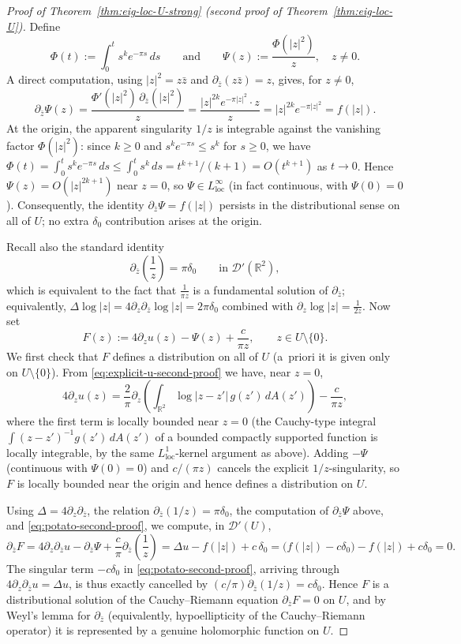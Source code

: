 \documentclass[a4paper,11pt,reqno]{amsart}
\numberwithin{equation}{section}
\theoremstyle{plain} %
\theoremstyle{definition} %
\theoremstyle{remark}
\newcommand{\R}{\mathbb{R}}
\begin{document}
\begin{proof}[Proof of Theorem~\ref{thm:eig-loc-U-strong} (second proof of Theorem~\ref{thm:eig-loc-U})]
Define
\[
\Phi(t):=\int_0^t s^k e^{-\pi s}\,ds
\qquad\text{and}\qquad
\Psi(z):=\frac{\Phi(|z|^2)}{z},
\quad z\neq 0.
\]
A direct computation, using \(|z|^2=z\bar z\) and \(\partial_{\bar z}(z\bar z)=z\), gives, for
\(z\neq 0\),
\[
\partial_{\bar z}\Psi(z)
=
\frac{\Phi'(|z|^2)\,\partial_{\bar z}(|z|^2)}{z}
=
\frac{|z|^{2k}e^{-\pi|z|^2}\cdot z}{z}
=
|z|^{2k}e^{-\pi|z|^2}
=
f(|z|).
\]
At the origin, the apparent singularity \(1/z\) is integrable against the vanishing factor
\(\Phi(|z|^2)\): since \(k\ge 0\) and \(s^k e^{-\pi s}\le s^k\) for \(s\ge 0\), we have
\(\Phi(t)=\int_0^t s^k e^{-\pi s}\,ds\le \int_0^t s^k\,ds = t^{k+1}/(k+1)=O(t^{k+1})\) as
\(t\to 0\). Hence \(\Psi(z)=O(|z|^{2k+1})\) near \(z=0\), so \(\Psi\in L^\infty_{\mathrm{loc}}\)
(in fact continuous, with \(\Psi(0)=0\)). Consequently, the identity
\(\partial_{\bar z}\Psi=f(|z|)\) persists in the distributional sense on all of \(U\); no extra
\(\delta_0\) contribution arises at the origin.

Recall also the standard identity
\[
\partial_{\bar z}\!\left(\frac{1}{z}\right)=\pi\delta_0
\qquad\text{in }\mathcal D'(\R^2),
\]
which is equivalent to the fact that \(\frac{1}{\pi z}\) is a fundamental solution of
\(\partial_{\bar z}\); equivalently, \(\Delta\log|z|=4\partial_z\partial_{\bar z}\log|z|=2\pi\delta_0\)
combined with \(\partial_z\log|z|=\frac{1}{2z}\). Now set
\[
F(z):=4\partial_z u(z)-\Psi(z)+\frac{c}{\pi z},
\qquad z\in U\setminus\{0\}.
\]
We first check that \(F\) defines a distribution on all of \(U\) (a~priori it is given only on
\(U\setminus\{0\}\)). From \eqref{eq:explicit-u-second-proof} we have, near \(z=0\),
\[
4\partial_z u(z)
=
\frac{2}{\pi}\partial_z\!\left(\int_{\R^2}\log|z-z'|\,g(z')\,dA(z')\right)-\frac{c}{\pi z},
\]
where the first term is locally bounded near \(z=0\) (the Cauchy-type integral
\(\int (z-z')^{-1} g(z')\,dA(z')\) of a bounded compactly supported function is locally
integrable, by the same \(L^1_{\mathrm{loc}}\)-kernel argument as above). Adding \(-\Psi\)
(continuous with \(\Psi(0)=0\)) and \(c/(\pi z)\) cancels the explicit \(1/z\)-singularity, so
\(F\) is locally bounded near the origin and hence defines a distribution on \(U\).

Using \(\Delta=4\partial_z\partial_{\bar z}\), the relation \(\partial_{\bar z}(1/z)=\pi\delta_0\),
the computation of \(\partial_{\bar z}\Psi\) above, and \eqref{eq:potato-second-proof}, we
compute, in \(\mathcal D'(U)\),
\[
\partial_{\bar z}F
=
4\partial_z\partial_{\bar z}u-\partial_{\bar z}\Psi+\frac{c}{\pi}\partial_{\bar z}\!\left(\frac{1}{z}\right)
=
\Delta u-f(|z|)+c\,\delta_0
=
\bigl(f(|z|)-c\delta_0\bigr)-f(|z|)+c\delta_0
=0.
\]
The singular term \(-c\delta_0\) in \eqref{eq:potato-second-proof}, arriving through
\(4\partial_z\partial_{\bar z}u=\Delta u\), is thus exactly cancelled by
\((c/\pi)\partial_{\bar z}(1/z)=c\delta_0\). Hence \(F\) is a distributional solution of the
Cauchy--Riemann equation \(\partial_{\bar z}F=0\) on \(U\), and by Weyl's lemma for
\(\partial_{\bar z}\) (equivalently, hypoellipticity of the Cauchy--Riemann operator) it is
represented by a genuine holomorphic function on \(U\).


\end{proof}
\end{document}
